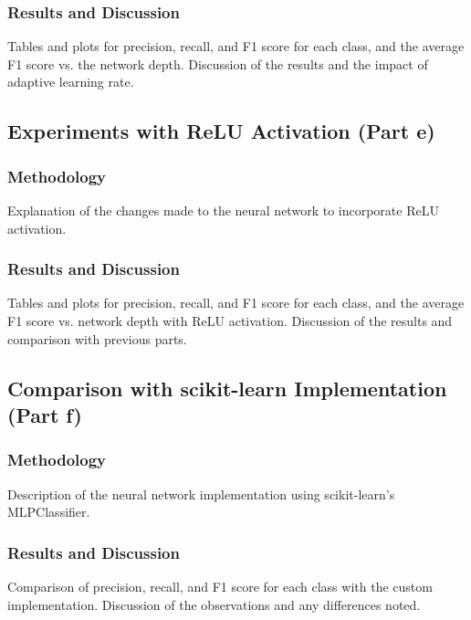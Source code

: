 \documentclass[12pt]{article}
\begin{document}
\subsubsection{Results and Discussion}
Tables and plots for precision, recall, and F1 score for each class, and the average F1 score vs. the network depth. Discussion of the results and the impact of adaptive learning rate.

\subsection{Experiments with ReLU Activation (Part e)}
\subsubsection{Methodology}
Explanation of the changes made to the neural network to incorporate ReLU activation.

\subsubsection{Results and Discussion}
Tables and plots for precision, recall, and F1 score for each class, and the average F1 score vs. network depth with ReLU activation. Discussion of the results and comparison with previous parts.

\subsection{Comparison with scikit-learn Implementation (Part f)}
\subsubsection{Methodology}
Description of the neural network implementation using scikit-learn's MLPClassifier.

\subsubsection{Results and Discussion}
Comparison of precision, recall, and F1 score for each class with the custom implementation. Discussion of the observations and any differences noted.
\end{document}
